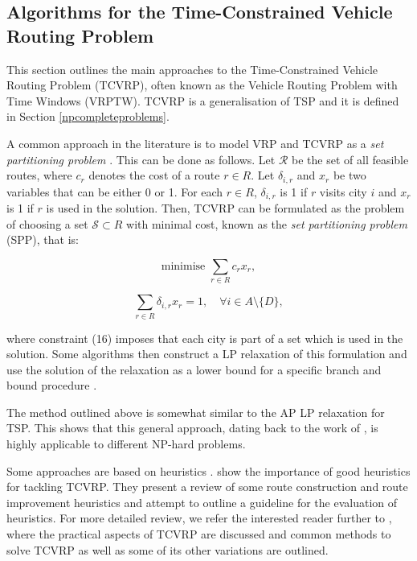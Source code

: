 \documentclass{mprop}
\theoremstyle{definition}
\begin{document}
\subsection{Algorithms for the Time-Constrained Vehicle Routing Problem}
\label{sec:tcvrpalgos}
This section outlines the main approaches to the Time-Constrained Vehicle Routing Problem (TCVRP), often known as the Vehicle Routing Problem with Time Windows (VRPTW). TCVRP is a generalisation of TSP and it is defined in Section \ref{npcompleteproblems}.

A common approach in the literature is to model VRP and TCVRP as a \textit{set partitioning problem} \citep{Desrochers92,Agarwal89,Desrosiers84,Alvarenga07}. This can be done as follows. Let $\mathcal{R}$ be the set of all feasible routes, where $c_{r}$ denotes the cost of a route $r \in R$. Let $\delta_{i,r}$ and $x_{r}$ be two variables that can be either 0 or 1. For each $r \in R$, $\delta_{i,r}$ is 1 if $r$ visits city $i$ and $x_{r}$ is 1 if $r$ is used in the solution. Then, TCVRP can be formulated as the problem of choosing a set $\mathcal{S} \subset R$ with minimal cost, known as the \textit{set partitioning problem} (SPP), that is:

\begin{equation}
\label{eq:tcvrpobjfunc}
\textrm{minimise } \sum_{r \in R} c_{r} x_{r},
\end{equation}

\begin{equation}
\label{eq:tcvrpconstraint1}
\sum_{r \in R} \delta_{i,r} x_{r} = 1, \quad \forall i \in A \setminus \{D\},
\end{equation}

where constraint (16) imposes that each city is part of a set which is used in the solution. Some algorithms then construct a LP relaxation of this formulation and use the solution of the relaxation as a lower bound for a specific branch and bound procedure \citep{Desrochers92,Agarwal89}.

The method outlined above is somewhat similar to the AP LP relaxation for TSP. This shows that this general approach, dating back to the work of \citet{Dantzig54}, is highly applicable to different NP-hard problems.

Some approaches are based on heuristics \citep{Tan99heuristicmethods,Cheng09}. \citet{Braysy05,Braysy05a} show the importance of good heuristics for tackling TCVRP. They present a review of some route construction and route improvement heuristics and attempt to outline a guideline for the evaluation of heuristics.
For more detailed review, we refer the interested reader further to \citet{Toth14}, where the practical aspects of TCVRP are discussed and common methods to solve TCVRP as well as some of its other variations are outlined.
\end{document}
